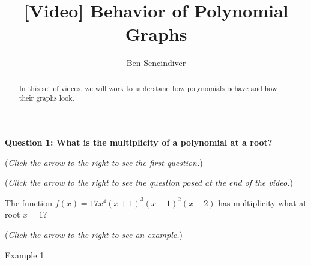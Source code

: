 \documentclass{ximera}
\title[Prerequisite Videos: ]{[Video] Behavior of Polynomial Graphs}
\author{Ben Sencindiver}
\begin{document}
\begin{abstract}
   In this set of videos, we will work to understand how 
   polynomials behave and how their graphs look.  
\end{abstract}
\maketitle

\textbf{Question 1: What is the multiplicity of a polynomial at a root?}
\begin{question}
\begin{flushright}
{\color{blue}(\emph{Click the arrow to the right to see the first question.})}
\end{flushright}
\begin{center}
\begin{expandable}
\begin{flushright}
{\color{blue}(\emph{Click the arrow to the right to see the question
posed at the end of the video.})}
\end{flushright}
\begin{expandable}
The function $f(x) = 17x^4(x+1)^3(x-1)^2(x-2)$ has multiplicity what at root $x=1$?
\begin{multipleChoice}
\end{multipleChoice}
\begin{flushright}
{\color{blue}(\emph{Click the arrow to the right to see an example.})}
\end{flushright}
\begin{expandable}
Example 1
\end{expandable}
\end{expandable}
\end{expandable}
\end{center}
\end{question}
\end{document}
